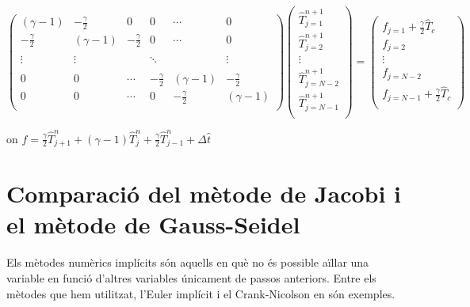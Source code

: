 \documentclass[11pt]{article}
\begin{document}
\begin{equation}
  \begin{pmatrix}
    (\gamma - {1}) & {-}\frac{\gamma}{2} & {0} & {0} & \cdots & {0} \\
    {-}\frac{\gamma}{2} & (\gamma - {1}) & {-}\frac{\gamma}{2} & {0} & \cdots & {0} \\
    & \\
    \vdots & \vdots & & \ddots & & \vdots \\
    & \\
    {0} & {0} & \cdots & {-}\frac{\gamma}{2} & (\gamma - {1}) & {-}\frac{\gamma}{2} \\
    {0} & {0} & \cdots & {0} & {-}\frac{\gamma}{2} & (\gamma - {1}) \\
    \end{pmatrix}
    \begin{pmatrix}
        \hat{T}_{j=1}^{n+1} \\
        \hat{T}_{j=2}^{n+1} \\
        \vdots \\
        \hat{T}_{j=N-2}^{n+1} \\
        \hat{T}_{j=N-1}^{n+1} \\
    \end{pmatrix}
    =
    \begin{pmatrix}
        f_{j=1} +\frac{\gamma}{2}\hat{T}_{c} \\
        f_{j=2} \\
        \vdots \\
        f_{j=N-2} \\
        f_{j=N-1} +\frac{\gamma}{2}\hat{T}_{c} \\
    \end{pmatrix}
\end{equation}

\begin{center}
on $f = \frac{\gamma}{2}\hat{T}_{j+1}^{n} + (\gamma - {1})\hat{T}_{j}^{n} + \frac{\gamma}{2}\hat{T}_{j-1}^{n} + \Delta\hat{t}$
\end{center}

\section{Comparació del mètode de Jacobi i el mètode de Gauss-Seidel}
\label{subsec: comparacio jacobi gs}

Els mètodes numèrics implícits són aquells en què no és possible aïllar una variable en funció d'altres variables únicament de passos anteriors. Entre els mètodes que hem utilitzat, l’Euler implícit i el Crank-Nicolson en són exemples.
\end{document}
